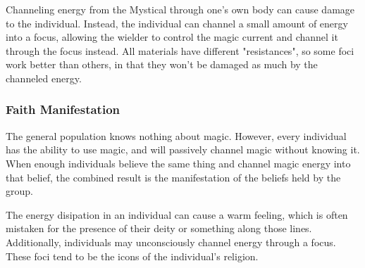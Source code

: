 \documentclass[
a4paper,
10pt,
twoside,
]{article}
\begin{document}
Channeling energy from the Mystical through one's own body can cause damage to the individual.
Instead, the individual can channel a small amount of energy into a focus, allowing the wielder to control the magic current and channel it through the focus instead.
All materials have different "resistances", so some foci work better than others, in that they won't be damaged as much by the channeled energy.

\subsubsection{Faith Manifestation}

The general population knows nothing about magic.
However, every individual has the ability to use magic, and will passively channel magic without knowing it.
When enough individuals believe the same thing and channel magic energy into that belief, the combined result is the manifestation of the beliefs held by the group.

The energy disipation in an individual can cause a warm feeling, which is often mistaken for the presence of their deity or something along those lines.
Additionally, individuals may unconsciously channel energy through a focus.
These foci tend to be the icons of the individual's religion.



\stopmcols
\end{document}
